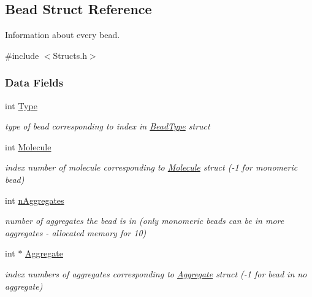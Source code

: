 \hypertarget{structBead}{}\subsection{Bead Struct Reference}
\label{structBead}


Information about every bead.  




{\ttfamily \#include $<$Structs.\+h$>$}

\subsubsection*{Data Fields}
\begin{DoxyCompactItemize}
\item 
\mbox{\label{structBead_a6a86d46fc157f7c12aa26e41557cae51}} 
int \hyperlink{structBead_a6a86d46fc157f7c12aa26e41557cae51}{Type}
\begin{DoxyCompactList}\small\item\em type of bead corresponding to index in \hyperlink{structBeadType}{Bead\+Type} struct \end{DoxyCompactList}\item 
\mbox{\label{structBead_a2c2bc3934dff5feea941a09f56854dc7}} 
int \hyperlink{structBead_a2c2bc3934dff5feea941a09f56854dc7}{Molecule}
\begin{DoxyCompactList}\small\item\em index number of molecule corresponding to \hyperlink{structMolecule}{Molecule} struct (-\/1 for monomeric bead) \end{DoxyCompactList}\item 
\mbox{\label{structBead_ab60a3689575e8bf1e49e2412e4e6cbcc}} 
int \hyperlink{structBead_ab60a3689575e8bf1e49e2412e4e6cbcc}{n\+Aggregates}
\begin{DoxyCompactList}\small\item\em number of aggregates the bead is in (only monomeric beads can be in more aggregates -\/ allocated memory for 10) \end{DoxyCompactList}\item 
\mbox{\label{structBead_aaeeef09dce9becdb706503ed61c4ab32}} 
int $\ast$ \hyperlink{structBead_aaeeef09dce9becdb706503ed61c4ab32}{Aggregate}
\begin{DoxyCompactList}\small\item\em index numbers of aggregates corresponding to \hyperlink{structAggregate}{Aggregate} struct (-\/1 for bead in no aggregate) \end{DoxyCompactList}\item 

\end{DoxyCompactItemize}
